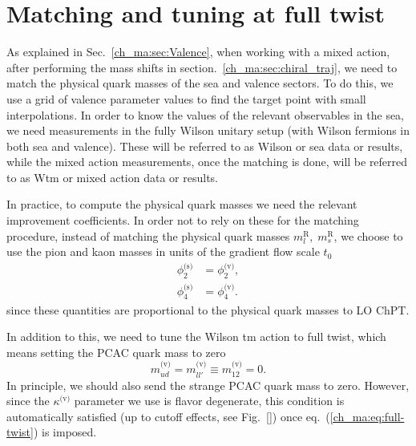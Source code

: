 

\section{Matching and tuning at full twist}
\label{ch_ma:sec:matching}

As explained in Sec.~\ref{ch_ma:sec:Valence}, when working with a mixed action, after performing the mass shifts in section.~\ref{ch_ma:sec:chiral_traj}, we need to match the physical quark masses of the sea and valence sectors. To do this, we use a grid of valence parameter values to find the target point with small interpolations. In order to know the values of the relevant observables in the sea, we need measurements in the fully Wilson unitary setup (with Wilson fermions in both sea and valence). These will be referred to as Wilson or sea data or results, while the mixed action measurements, once the matching is done, will be referred to as Wtm or mixed action data or results.

In practice, to compute the physical quark masses we need the relevant improvement coefficients. In order not to rely on these for the matching procedure, instead of matching the physical quark masses $m_l^{\textrm{R}},\;m_s^{\textrm{R}}$, we choose to use the pion and kaon masses in units of the gradient flow scale $t_0$
\begin{align}
\label{ch_ma:eq:matching}
\phi_2^{\textrm{(s)}}&=\phi_2^{\textrm{(v)}},\\
\phi_4^{\textrm{(s)}}&=\phi_4^{\textrm{(v)}}.
\end{align}
since these quantities are proportional to the physical quark masses to LO ChPT.

In addition to this, we need to tune the Wilson tm action to full twist, which means setting the PCAC quark mass to zero
\begin{equation}
\label{ch_ma:eq:full-twist}
m_{ud}^{\textrm{(v)}}=m_{ll'}^{\textrm{(v)}}\equiv m_{12}^{\textrm{(v)}}=0.
\end{equation}
In principle, we should also send the strange PCAC quark mass to zero. However, since the $\kappa^{\textrm{(v)}}$ parameter we use is flavor degenerate, this condition is automatically satisfied (up to cutoff effects, see Fig.~\ref{}) once eq.~(\ref{ch_ma:eq:full-twist}) is imposed.

